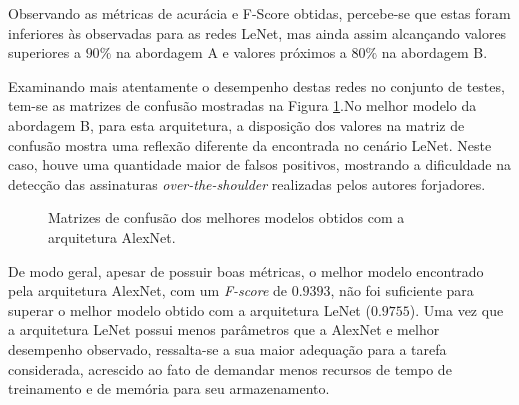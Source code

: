 Observando as métricas de acurácia e F-Score obtidas, percebe-se que estas foram inferiores às observadas para as redes LeNet, mas ainda assim alcançando valores superiores a $90\%$ na abordagem A e valores próximos a $80\%$ na abordagem B. 

Examinando mais atentamente o desempenho destas redes no conjunto de testes, tem-se as matrizes de confusão mostradas na Figura \ref{fig:matrizes-alexnet}.No melhor modelo da abordagem B, para esta arquitetura, a disposição dos valores na matriz de confusão mostra uma reflexão diferente da encontrada no cenário LeNet. Neste caso, houve uma quantidade maior de falsos positivos, mostrando a dificuldade na detecção das assinaturas \emph{over-the-shoulder} realizadas pelos autores forjadores.

\begin{figure}[H]
 \centering
 \caption{Matrizes de confusão dos melhores modelos obtidos com a arquitetura AlexNet.}
 \hfill
 \label{fig:matrizes-alexnet}
\end{figure}

De modo geral, apesar de possuir boas métricas, o melhor modelo encontrado pela arquitetura AlexNet, com um \emph{F-score} de $0.9393$, não foi suficiente para superar o melhor modelo obtido com a arquitetura LeNet ($0.9755$). Uma vez que a arquitetura LeNet possui menos parâmetros que a AlexNet e melhor desempenho observado, ressalta-se a sua maior adequação para a tarefa considerada, acrescido ao fato de demandar menos recursos de tempo de treinamento e de memória para seu armazenamento.
